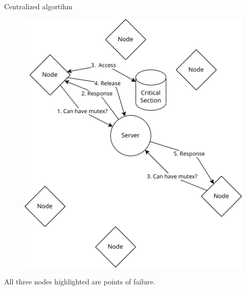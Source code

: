 \documentclass[aspectratio=1610,17pt,utf8]{beamer}
\begin{document}
\begin{frame}{Centralized algortihm}
    \begin{minipage}{.45\textwidth}
        \begin{figure}
            \includegraphics[width=\textwidth]{figures/1-mutex.png}
        \end{figure}
    \end{minipage}
    \begin{minipage}{.5\textwidth}
        \tiny{All three nodes highlighted are points of failure.}
    \end{minipage}
\end{frame}
\end{document}

